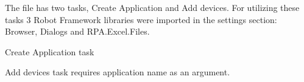 The file has two tasks, Create Application and Add devices.
For utilizing these tasks 3 Robot Framework libraries were imported in the settings section: Browser, Dialogs and RPA.Excel.Files.

Create Application task

Add devices task requires application name as an argument.

\cite{chirpstack:getting_started}
\cite{robot_framwework_user_guide:suite_setup_and_teardown}
\clearpage %

